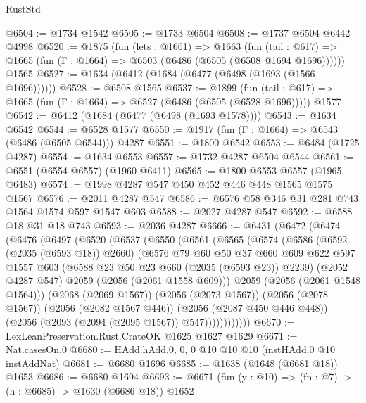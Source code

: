 \begin{lexlean}{RustStd}
\begin{coremodule}
@6504 := @1734 @1542
@6505 := @1733 @6504
@6508 := @1737 @6504 @6442 @4998
@6520 := @1875
    (fun (lets : @1661) =>
    @1663
      (fun (tail : @617) => @1665 (fun (Γ : @1664) => @6503 (@6486 (@6505 (@6508 @1694 @1696))))))
    @1565
@6527 := @1634 (@6412 (@1684 (@6477 (@6498 (@1693 (@1566 @1696))))))
@6528 := @6508 @1565
@6537 := @1899
    (fun (tail : @617) => @1665 (fun (Γ : @1664) => @6527 (@6486 (@6505 (@6528 @1696)))))
    @1577
@6542 := @6412 (@1684 (@6477 (@6498 (@1693 @1578))))
@6543 := @1634 @6542
@6544 := @6528 @1577
@6550 := @1917 (fun (Γ : @1664) => @6543 (@6486 (@6505 @6544))) @4287
@6551 := @1800 @6542
@6553 := @6484 (@1725 @4287)
@6554 := @1634 @6553
@6557 := @1732 @4287 @6504 @6544
@6561 := @6551 (@6554 @6557) (@1960 @6411)
@6565 := @1800 @6553 @6557 (@1965 @6483)
@6574 := @1998 @4287 @547 @450 @452 @446 @448 @1565 @1575 @1567
@6576 := @2011 @4287 @547
@6586 := @6576 @58 @346 @31 @281 @743 @1564 @1574 @597 @1547 @603
@6588 := @2027 @4287 @547
@6592 := @6588 @18 @31 @18 @743
@6593 := @2036 @4287
@6666 := @6431
    (@6472
      (@6474
        (@6476
          (@6497
            (@6520
              (@6537
                (@6550
                  (@6561
                    (@6565
                      (@6574
                        (@6586
                          (@6592 (@2035 (@6593 @18)) @2660)
                          (@6576
                            @79
                            @60
                            @50
                            @37
                            @660
                            @609
                            @622
                            @597
                            @1557
                            @603
                            (@6588 @23 @50 @23 @660 (@2035 (@6593 @23)) @2239)
                            (@2052 @4287 @547)
                            @2059
                            (@2056 (@2061 @1558 @609)))
                          @2059
                          (@2056 (@2061 @1548 @1564)))
                        (@2068 (@2069 @1567))
                        (@2056 (@2073 @1567))
                        (@2056 (@2078 @1567))
                        (@2056 (@2082 @1567 @446))
                        (@2056 (@2087 @450 @446 @448))
                        (@2056 (@2093 (@2094 (@2095 @1567)) @547))))))))))))
@6670 := LexLeanPreservation.Rust.CrateOK @1625 @1627 @1629
@6671 := Nat.casesOn.{0}
@6680 := HAdd.hAdd.{0, 0, 0} @10 @10 @10 (instHAdd.{0} @10 instAddNat)
@6681 := @6680 @1696
@6685 := @1638 (@1648 (@6681 @18)) @1653
@6686 := @6680 @1694
@6693 := @6671 (fun (y : @10) => (fn : @7) -> (h : @6685) -> @1630 (@6686 @18)) @1652

\end{coremodule}
\end{lexlean}
